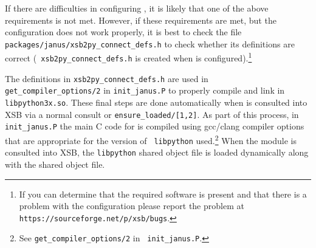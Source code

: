 %
%
%
%
%

If there are difficulties in configuring \janusplg , it is likely that
one of the above requirements is not met.  However, if these
requirements are met, but the configuration does not work properly, it
is best to check the file {\tt packages/janus/xsb2py\_connect\_defs.h}
to check whether its definitions are correct ({\tt
  xsb2py\_connect\_defs.h} is created when \janus{} is
configured).\footnote{If you can determine that the required software
is present and that there is a problem with the configuration please
report the problem at {\tt https://sourceforge.net/p/xsb/bugs}.}

The definitions in {\tt xsb2py\_connect\_defs.h} are used in {\tt
  get\_compiler\_options/2} in {\tt init\_janus.P} to properly compile
\janusplg{} and link in {\tt libpython3x.so}.  These final steps are
done automatically when \janusplg{} is consulted into XSB via a normal
consult or {\tt ensure\_loaded/[1,2]}.  As part of this process, in
{\tt init\_janus.P} the main C code for  \janusplg{} is compiled using
gcc/clang compiler options that are appropriate for the version of {\tt
  libpython} used.\footnote{See {\tt get\_compiler\_options/2} in {\tt
  init\_janus.P}.}  When the  \janusplg{} module is consulted into XSB,
the {\tt libpython} shared object file is loaded dynamically along
with the \janus{} shared object file.

%
%

